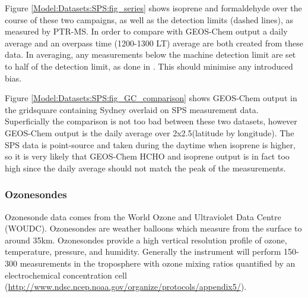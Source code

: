     Figure \ref{Model:Datasets:SPS:fig_series} shows isoprene and formaldehyde over the course of these two campaigns, as well as the detection limits (dashed lines), as measured by PTR-MS. 
    In order to compare with GEOS-Chem output a daily average and an overpass time (1200-1300 LT) average are both created from these data.
    In averaging, any measurements below the machine detection limit are set to half of the detection limit, as done in \textcite{Lawson2015}. 
    This should minimise any introduced bias.
    
    {\label{Model:Datasets:SPS:fig_series}}
    
    Figure \ref{Model:Datasets:SPS:fig_GC_comparison} shows GEOS-Chem output in the gridsquare containing Sydney overlaid on SPS measurement data.
    Superficially the comparison is not too bad between these two datasets, however GEOS-Chem output is the daily average over 2x2.5\degr (latitude by longitude).
    The SPS data is point-source and taken during the daytime when isoprene is higher, so it is very likely that GEOS-Chem HCHO and isoprene output is in fact too high since the daily average should not match the peak of the measurements.
    
    
    
    \subsubsection{Ozonesondes}
    \label{Model:Datasets:ozonesondes}
    
    Ozonesonde data comes from the World Ozone and Ultraviolet Data Centre (WOUDC).
    Ozonesondes are weather balloons which measure from the surface to around 35km.
    Ozonesondes provide a high vertical resolution profile of ozone, temperature, pressure, and humidity.
    Generally the instrument will perform 150-300 measurements in the troposphere with ozone mixing ratios quantified by an electrochemical concentration cell (\url{http://www.ndsc.ncep.noaa.gov/organize/protocols/appendix5/}).
    
